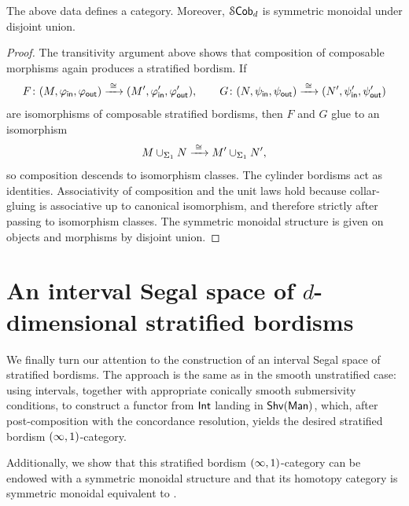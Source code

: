 \begin{proposition}
    The above data defines a category. Moreover, $\mathcal S\mathsf{Cob}_d$ is symmetric monoidal under disjoint union.
\end{proposition}
\begin{proof}
    The transitivity argument above shows that composition of composable morphisms again produces a stratified bordism. If
    \begin{equation}
        F\colon (M,\varphi_{\sf in},\varphi_{\sf out}) \xrightarrow{\;\cong\;} (M',\varphi'_{\sf in},\varphi'_{\sf out}), \qquad G\colon (N,\psi_{\sf in},\psi_{\sf out}) \xrightarrow{\;\cong\;} (N',\psi'_{\sf in},\psi'_{\sf out})
    \end{equation}
    are isomorphisms of composable stratified bordisms, then $F$ and $G$ glue to an isomorphism
    \begin{equation}
        M\cup_{\Sigma_1}N \xrightarrow{\;\cong\;} M'\cup_{\Sigma_1}N',
    \end{equation}
    so composition descends to isomorphism classes. The cylinder bordisms act as identities. Associativity of composition and the unit laws hold because collar-gluing is associative up to canonical isomorphism, and therefore strictly after passing to isomorphism classes. The symmetric monoidal structure is given on objects and morphisms by disjoint union.
\end{proof}

\section{An interval Segal space of \texorpdfstring{$d$}{d}-dimensional stratified bordisms}

We finally turn our attention to the construction of an interval Segal space of stratified bordisms. The approach is the same as in the smooth unstratified case: using intervals, together with appropriate conically smooth submersivity conditions, to construct a functor from $\operatorname{\mathsf{Int}}$ landing in $\operatorname{\sf Shv}(\operatorname{\sf Man})$, which, after post-composition with the concordance resolution, yields the desired stratified bordism $(\operatorname{\infty},1)$-category.

Additionally, we show that this stratified bordism $(\operatorname{\infty},1)$-category can be endowed with a symmetric monoidal structure and that its homotopy category is symmetric monoidal equivalent to .



